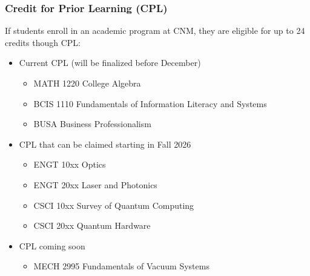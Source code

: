 \documentclass{beamer}
\begin{document}
\begin{frame}\frametitle{Credit for Prior Learning (CPL)}
If students enroll in an academic program at CNM, they are eligible for up to 24 credits though CPL:

\begin{itemize}
\item Current CPL (will be finalized before December)
\begin{itemize}
\item MATH 1220 College Algebra
\item BCIS 1110 Fundamentals of Information Literacy and Systems
\item BUSA Business Professionalism
\end{itemize}
\item CPL that can be claimed starting in Fall 2026
\begin{itemize}
\item ENGT 10xx Optics
\item ENGT 20xx Laser and Photonics
\item CSCI 10xx Survey of Quantum Computing
\item CSCI 20xx Quantum Hardware
\end{itemize}
\item CPL coming soon
\begin{itemize}
\item MECH 2995 Fundamentals of Vacuum Systems
\end{itemize}
\end{itemize}
\end{frame}
\end{document}
